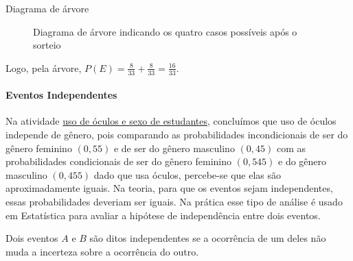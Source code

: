 \begin{example} {Diagrama de árvore}
\begin{figure}[H]
\caption{Diagrama de árvore indicando os quatro casos possíveis após o sorteio}
\label{arvore3}
\end{figure}

Logo, pela árvore, \(\displaystyle P(E)=\frac{8}{33}+\frac{8}{33}=\frac{16}{33}\).
\end{example}


\paragraph{Eventos Independentes}

Na atividade \hyperref[uso-oculos]{uso de óculos e sexo de estudantes}, concluímos que uso de óculos independe de gênero, pois  comparando as probabilidades incondicionais de ser do gênero feminino $(0{,}55)$ e de ser do gênero masculino $(0{,}45)$ com as probabilidades condicionais de ser do gênero feminino $(0{,}545)$ e do gênero masculino $(0{,}455)$ dado que usa óculos, percebe-se que elas são aproximadamente iguais. Na teoria, para que os eventos sejam independentes, essas probabilidades deveriam ser iguais. Na prática esse tipo de análise é usado em Estatística para avaliar a hipótese de independência entre dois eventos.
\begin{observation}
Dois eventos \(A\) e \(B\) são ditos independentes se a ocorrência de um deles não muda a incerteza sobre a ocorrência do outro.
\end{observation}

